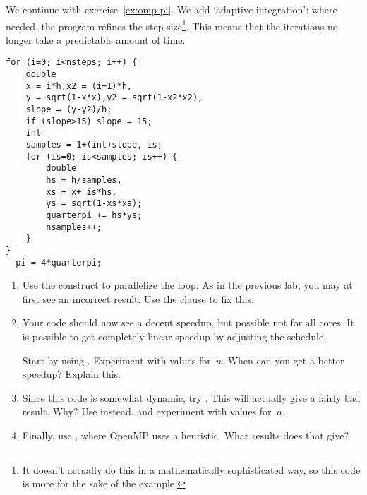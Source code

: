 \begin{exercise}
  \label{ex:omp-pi-adapt}
  We continue with exercise~\ref{ex:omp-pi}.  We add `adaptive
  integration': where needed, the program refines the step
  size\footnote{It doesn't actually do this in a mathematically
    sophisticated way, so this code is more for the sake of the
    example.}.  This means that the iterations no longer take a
  predictable amount of time.

\begin{multicols}{2}
\begin{lstlisting}
for (i=0; i<nsteps; i++) {
    double
    x = i*h,x2 = (i+1)*h,
    y = sqrt(1-x*x),y2 = sqrt(1-x2*x2),
    slope = (y-y2)/h;
    if (slope>15) slope = 15;
    int
    samples = 1+(int)slope, is;
    for (is=0; is<samples; is++) {
        double
        hs = h/samples,
        xs = x+ is*hs,
        ys = sqrt(1-xs*xs);
        quarterpi += hs*ys;
        nsamples++;
    }
}
  pi = 4*quarterpi;
\end{lstlisting}
\end{multicols}

\begin{enumerate}
\item Use the  construct to parallelize the loop.
  As in the previous lab, you may at first see an incorrect result.
  Use the  clause to fix this.
\item Your code should now see a decent speedup, but possible not for all cores.
  It is possible to get completely linear speedup by adjusting the schedule.

  Start by using . Experiment with values
  for~$n$.  When can you get a better speedup? Explain this.
\item Since this code is somewhat dynamic, try .
  This will actually give a fairly bad result. Why?  Use
   instead, and experiment with values
  for~$n$.
\item Finally, use , where OpenMP uses a
  heuristic.  What results does that give?
\end{enumerate}
     
\end{exercise}

